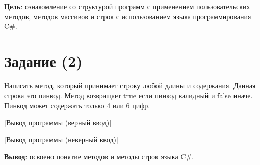 \documentclass{bsuir}
\newcommand{\csharp}{C{\liberationrm\#}}
\begin{document}
\maketitle
\mainmatter
\renewcommand{\thefigure}{\arabic{figure}}
\renewcommand{\thelisting}{\arabic{listing}}

\textbf{Цель}: ознакомление со структурой программ с применением
пользовательских методов, методов массивов и строк с использованием языка
программирования \csharp.

\section*{Задание (2)}

Написать метод, который принимает строку любой длины и содержания. Данная строка
это пинкод. Метод возвращает true если пинкод валидный и false иначе. Пинкод
может содержать только 4 или 6 цифр.


[Вывод программы (верный ввод)]

[Вывод программы (неверный ввод)]

\textbf{Вывод}: освоено понятие методов и методы строк языка \csharp.
\end{document}

